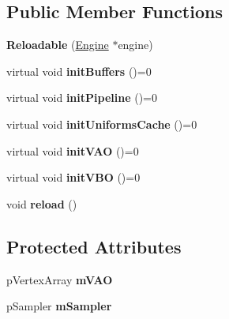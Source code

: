 \subsection*{Public Member Functions}
\begin{DoxyCompactItemize}
\item 
\hypertarget{classfillwave_1_1models_1_1Reloadable_a010355bd41b92f14b4409f74fc0c8dd7}{}{\bfseries Reloadable} (\hyperlink{classfillwave_1_1Engine}{Engine} $\ast$engine)\label{classfillwave_1_1models_1_1Reloadable_a010355bd41b92f14b4409f74fc0c8dd7}

\item 
\hypertarget{classfillwave_1_1models_1_1Reloadable_ac05cd2bc09e199ec68d2322651ca1c4a}{}virtual void {\bfseries init\+Buffers} ()=0\label{classfillwave_1_1models_1_1Reloadable_ac05cd2bc09e199ec68d2322651ca1c4a}

\item 
\hypertarget{classfillwave_1_1models_1_1Reloadable_a941f3c4c91e740dbea4121b1e32e893f}{}virtual void {\bfseries init\+Pipeline} ()=0\label{classfillwave_1_1models_1_1Reloadable_a941f3c4c91e740dbea4121b1e32e893f}

\item 
\hypertarget{classfillwave_1_1models_1_1Reloadable_aed1a4d77e0e58f2af0dd6d7854cfe105}{}virtual void {\bfseries init\+Uniforms\+Cache} ()=0\label{classfillwave_1_1models_1_1Reloadable_aed1a4d77e0e58f2af0dd6d7854cfe105}

\item 
\hypertarget{classfillwave_1_1models_1_1Reloadable_a51870494045dc9ee09b2b1eb64cecc57}{}virtual void {\bfseries init\+V\+A\+O} ()=0\label{classfillwave_1_1models_1_1Reloadable_a51870494045dc9ee09b2b1eb64cecc57}

\item 
\hypertarget{classfillwave_1_1models_1_1Reloadable_a3ebd14fb528b9911104ec67878dcfab1}{}virtual void {\bfseries init\+V\+B\+O} ()=0\label{classfillwave_1_1models_1_1Reloadable_a3ebd14fb528b9911104ec67878dcfab1}

\item 
\hypertarget{classfillwave_1_1models_1_1Reloadable_aaa6027d8c8afffb8f57f145972756203}{}void {\bfseries reload} ()\label{classfillwave_1_1models_1_1Reloadable_aaa6027d8c8afffb8f57f145972756203}

\end{DoxyCompactItemize}
\subsection*{Protected Attributes}
\begin{DoxyCompactItemize}
\item 
\hypertarget{classfillwave_1_1models_1_1Reloadable_a149e18073aad84f3d0c2960205e22867}{}p\+Vertex\+Array {\bfseries m\+V\+A\+O}\label{classfillwave_1_1models_1_1Reloadable_a149e18073aad84f3d0c2960205e22867}

\item 
\hypertarget{classfillwave_1_1models_1_1Reloadable_aa097de917d5db36c1efd3d12f24a2db9}{}p\+Sampler {\bfseries m\+Sampler}\label{classfillwave_1_1models_1_1Reloadable_aa097de917d5db36c1efd3d12f24a2db9}

\end{DoxyCompactItemize}


